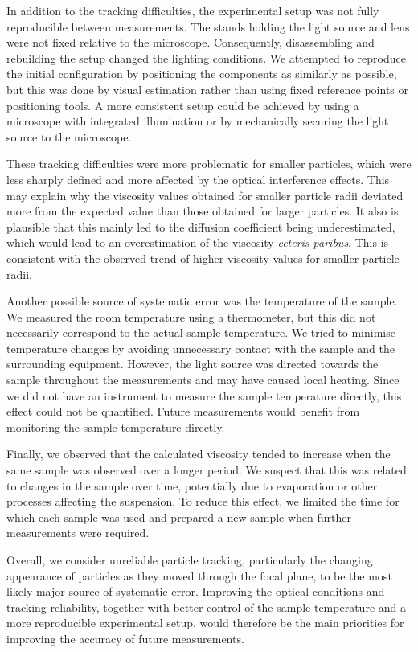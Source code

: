 \documentclass[twocolumn,a4paper,aps,amsmath,amssymb,floatfix,superscriptaddress]{revtex4-2}
\begin{document}
    In addition to the tracking difficulties, the experimental setup was not fully reproducible between measurements. The stands holding the light source and lens were not fixed relative to the microscope. Consequently, disassembling and rebuilding the setup changed the lighting conditions. We attempted to reproduce the initial configuration by positioning the components as similarly as possible, but this was done by visual estimation rather than using fixed reference points or positioning tools. A more consistent setup could be achieved by using a microscope with integrated illumination or by mechanically securing the light source to the microscope.

    These tracking difficulties were more problematic for smaller particles, which were less sharply defined and more affected by the optical interference effects. This may explain why the viscosity values obtained for smaller particle radii deviated more from the expected value than those obtained for larger particles.
    It also is plausible that this mainly led to the diffusion coefficient being underestimated, which would lead to an overestimation of the viscosity \textit{ceteris paribus}. This is consistent with the observed trend of higher viscosity values for smaller particle radii.

    Another possible source of systematic error was the temperature of the sample. We measured the room temperature using a thermometer, but this did not necessarily correspond to the actual sample temperature. We tried to minimise temperature changes by avoiding unnecessary contact with the sample and the surrounding equipment. However, the light source was directed towards the sample throughout the measurements and may have caused local heating. Since we did not have an instrument to measure the sample temperature directly, this effect could not be quantified. Future measurements would benefit from monitoring the sample temperature directly.

    Finally, we observed that the calculated viscosity tended to increase when the same sample was observed over a longer period. We suspect that this was related to changes in the sample over time, potentially due to evaporation or other processes affecting the suspension. To reduce this effect, we limited the time for which each sample was used and prepared a new sample when further measurements were required.

    Overall, we consider unreliable particle tracking, particularly the changing appearance of particles as they moved through the focal plane, to be the most likely major source of systematic error. Improving the optical conditions and tracking reliability, together with better control of the sample temperature and a more reproducible experimental setup, would therefore be the main priorities for improving the accuracy of future measurements.
\end{document}
